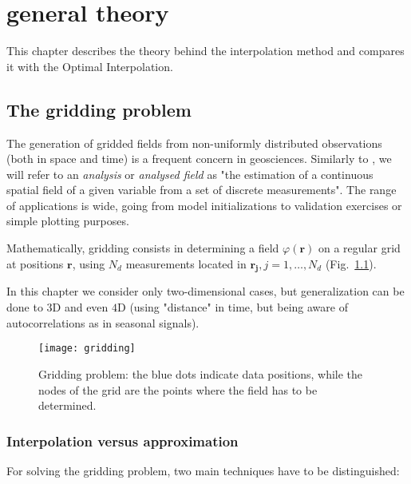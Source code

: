 \chapter{\diva general theory\label{chaptheory}}


This chapter describes the theory behind the \diva interpolation method and compares it with the Optimal Interpolation. 

\minitoc


\section{The gridding problem\label{gridding}}

The generation of gridded fields from non-uniformly distributed observations (both in space and time) is a frequent concern in geosciences. Similarly to \citet{OOYAMA87}, we will refer to an \textit{analysis} or \textit{analysed field} as "the estimation of a continuous spatial field of a given variable from a set of discrete measurements". The range of applications is wide, going from model initializations to validation exercises  or simple plotting purposes. 

Mathematically, gridding consists in determining a field $\varphi(\mathbf{r})$ on a regular grid at positions $\mathbf{r}$, using $N_{d}$ measurements located in $\mathbf{r_{j}}, j=1,\ldots, N_{d}$ (Fig.~\ref{gridproblem}).  

In this chapter we consider only two-dimensional cases, but generalization can be done to $3$D and even $4$D (using "distance" in time, but being aware of autocorrelations as in seasonal signals).

\begin{figure}[htpb]
	\centering
	\parbox{.5\textwidth}{
		\texttt{[image: gridding]}
		}\parbox{.5\textwidth}{
		\caption{Gridding problem: the blue dots indicate data positions, while the nodes of the grid  are the points where the field has to be determined.\label{gridproblem}}
		}
\end{figure}

\subsection{Interpolation versus approximation}

For solving the gridding problem, two main techniques have to be distinguished:

